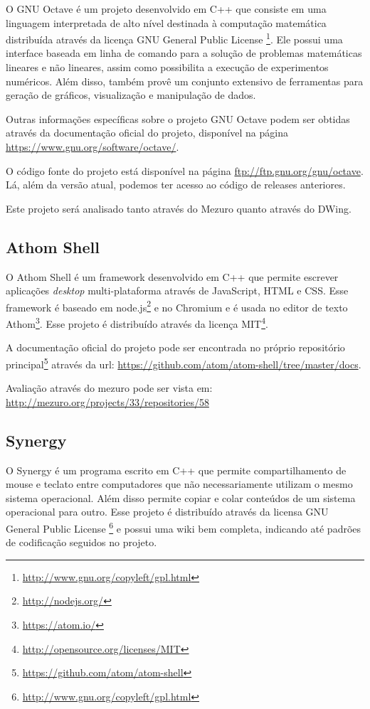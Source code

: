 O GNU Octave é um projeto desenvolvido em C++ que consiste em uma linguagem interpretada de alto nível destinada à computação matemática distribuída através da licença GNU General Public License \footnote{\url{http://www.gnu.org/copyleft/gpl.html}}. Ele possui uma interface baseada em linha de comando para a solução de problemas matemáticas lineares e não lineares, assim como possibilita a execução de experimentos numéricos. Além disso, também provê um conjunto extensivo de ferramentas para geração de gráficos, visualização e manipulação de dados.

Outras informações específicas sobre o projeto GNU Octave podem ser obtidas através da documentação oficial do projeto, disponível na página \url{https://www.gnu.org/software/octave/}.

O código fonte do projeto está disponível na página \url{ftp://ftp.gnu.org/gnu/octave}. Lá, além da versão atual, podemos ter acesso ao código de releases anteriores.

Este projeto será analisado tanto através do Mezuro quanto através do DWing.


\subsection{Athom Shell}
\label{section-athom}

O Athom Shell é um framework desenvolvido em C++ que permite escrever aplicações \emph{desktop} multi-plataforma através de JavaScript, HTML e CSS. Esse framework é baseado em node.js\footnote{\url{http://nodejs.org/}} e no Chromium e é usada no editor de texto Athom\footnote{\url{https://atom.io/}}. Esse projeto é distribuído através da licença MIT\footnote{\url{http://opensource.org/licenses/MIT}}.

A documentação oficial do projeto pode ser encontrada no próprio repositório principal\footnote{\url{https://github.com/atom/atom-shell}} através da url: \url{https://github.com/atom/atom-shell/tree/master/docs}.

Avaliação através do mezuro pode ser vista em: \url{http://mezuro.org/projects/33/repositories/58}

\subsection{Synergy}
\label{section-synergy}

O Synergy é um programa escrito em C++ que permite compartilhamento de mouse e teclato entre computadores que não necessariamente utilizam o mesmo sistema operacional. Além disso permite copiar e colar conteúdos de um sistema operacional para outro. Esse projeto é distribuído através da licensa GNU General Public License \footnote{\url{http://www.gnu.org/copyleft/gpl.html}} e possui uma wiki bem completa, indicando até padrões de codificação seguidos no projeto.

